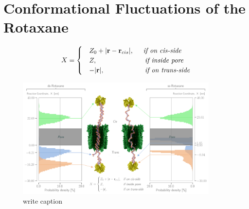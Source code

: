 \section{Conformational Fluctuations of the Rotaxane}

%
%
%
%

\begin{equation}
  X = \begin{cases}
        &Z_0 + |\textbf{r} - \textbf{r}_{cis}|, \hspace{0.5cm} \textit{if on cis-side}\\
        &Z, \hspace{2.5cm} \textit{if inside pore}\\
        &-|\textbf{r}|, \hspace{2.11cm} \textit{if on trans-side}
      \end{cases}
\end{equation}


\begin{figure}
\begin{center}
  \includegraphics[width=0.90\textwidth]{Figures/RotaxaneFluctuations.png}
  \caption{write caption}
\end{center}
\end{figure}

